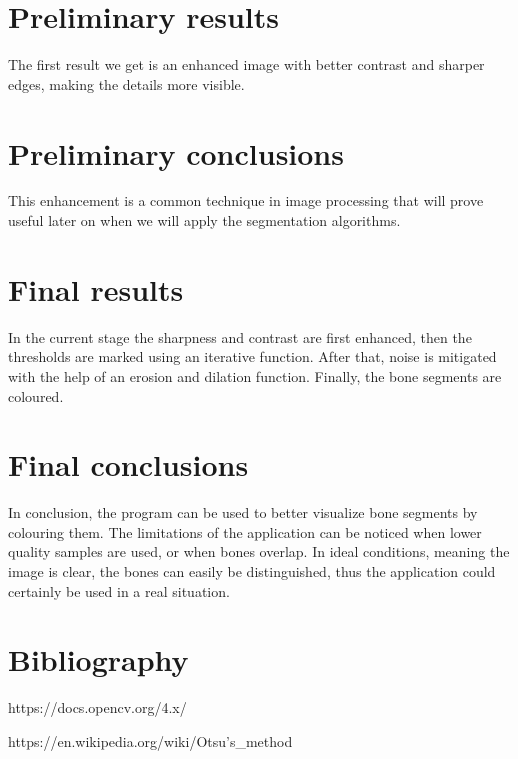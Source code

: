 \documentclass[conference]{IEEEtran}
\begin{document}
\section{Preliminary results}
The first result we get is an enhanced image with better contrast and sharper edges, making the details more visible. 

\section{Preliminary conclusions}
This enhancement is a common technique in image processing that will prove useful later on when we will apply the segmentation algorithms.

\section{Final results}
In the current stage the sharpness and contrast are first enhanced, then the thresholds are marked using an iterative function. After that, noise is mitigated with the help of an erosion and dilation function. Finally, the bone segments are coloured. 

\section{Final conclusions}
In conclusion, the program can be used to better visualize bone segments by colouring them. The limitations of the application can be noticed when lower quality samples are used, or when bones overlap. In ideal conditions, meaning the image is clear, the bones can easily be distinguished, thus the application could certainly be used in a real situation.

\section{Bibliography}
https://docs.opencv.org/4.x/

https://en.wikipedia.org/wiki/Otsu's_method
\end{document}
